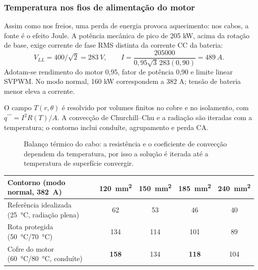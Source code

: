 \documentclass[12pt,a4paper]{article}
\newcommand{\itemsec}[2]{\FloatBarrier\Needspace{5\baselineskip}\subsubsection{#2}\label{item:#1}}
\begin{document}
\itemsec{30}{Temperatura nos fios de alimentação do motor}
Assim como nos freios, uma perda de energia provoca aquecimento: nos cabos, a fonte
é o efeito Joule. A potência mecânica de pico de 205 kW, acima da rotação de base, exige corrente de fase
RMS distinta da corrente CC da bateria:
\[
 V_{LL}=400/\sqrt2=\SI{283}{V},\qquad
 I=\frac{205000}{0{,}95\sqrt3\,283(0{,}90)}=\SI{489}{A}.
\]
Adotam-se rendimento do motor 0,95, fator de potência 0,90 e limite linear SVPWM.
No modo normal, 160 kW correspondem a 382 A; tensão de bateria menor eleva a corrente.

O campo $T(r,\theta)$ é resolvido por volumes finitos no cobre e no isolamento, com
$q^{\prime\prime\prime}=I^2R(T)/A$. A convecção de Churchill--Chu e a radiação são iteradas com a temperatura;
o contorno inclui conduíte, agrupamento e perda CA.
\begin{figure}[H]
\centering
{}
\caption{Balanço térmico do cabo: a resistência e o coeficiente de convecção dependem da
temperatura, por isso a solução é iterada até a temperatura de superfície convergir.}
\label{fig:fluxo_cabo}
\end{figure}
\begin{center}\small
\begin{tabular}{lcccc}
\toprule
Contorno (modo normal, \SI{382}{A}) & \SI{120}{mm^2} & \SI{150}{mm^2} & \SI{185}{mm^2} & \SI{240}{mm^2} \\
\midrule
Referência idealizada (\SI{25}{\celsius}, radiação plena) & 62 & 53 & 46 & 40 \\
Rota protegida (\SI{50}{\celsius}/\SI{70}{\celsius}) & 134 & 114 & 101 & 89 \\
Cofre do motor (\SI{60}{\celsius}/\SI{80}{\celsius}, conduíte) & \textbf{158} & 134 & \textbf{118} & 104 \\
\bottomrule
\end{tabular}
\end{center}
\end{document}

